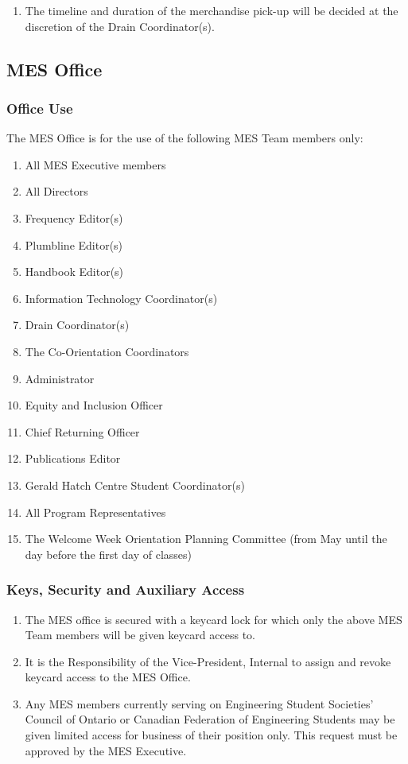 \begin{enumerate}
  \begin{enumerate}
   \item
    The timeline and duration of the merchandise pick-up will be decided at the discretion of the Drain Coordinator(s).
  \end{enumerate}
\end{enumerate}

\subsection{MES Office}
\label{mes-office}

\subsubsection{Office Use}
\label{office-use}

The MES Office is for the use of the following MES Team members only:

\begin{enumerate}
 \item
  All MES Executive members
 \item
  All Directors
 \item
  Frequency Editor(s)
 \item
  Plumbline Editor(s)
 \item
  Handbook Editor(s)
 \item
  Information Technology Coordinator(s)
 \item
  Drain Coordinator(s)
 \item
  The Co-Orientation Coordinators
 \item
  Administrator
 \item
  Equity and Inclusion Officer
 \item
  Chief Returning Officer
 \item
  Publications Editor
 \item
  Gerald Hatch Centre Student Coordinator(s)
 \item
  All Program Representatives
 \item
  The Welcome Week Orientation Planning Committee (from May until the day before the first day of classes)
\end{enumerate}

\subsubsection{Keys, Security and Auxiliary Access}
\label{keys-security-and-auxiliary-access}
\begin{enumerate}
 \item
  The MES office is secured with a keycard lock for which only the above MES Team members will be given keycard access to.
 \item
  It is the Responsibility of the Vice-President, Internal to assign and revoke keycard access to the MES Office.
 \item
  Any MES members currently serving on Engineering Student Societies' Council of Ontario or Canadian Federation of Engineering Students may be given limited access for business of their position only. This request must be approved by the MES Executive.
\end{enumerate}

